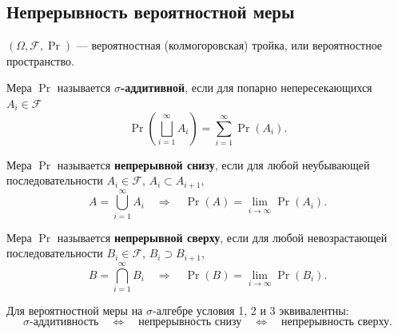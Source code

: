 \subsection{Непрерывность вероятностной меры}

\begin{definition}
    $(\Omega,\mathcal{F},\Pr)$ --- вероятностная (колмогоровская)
    тройка, или вероятностное пространство.
\end{definition}

\begin{definition}
    Мера $\Pr$ называется \textbf{$\sigma$-аддитивной}, если
    для попарно непересекающихся $A_i\in\mathcal{F}$
    \[
        \Pr\left(\bigsqcup_{i=1}^{\infty}A_i\right)
        =\sum_{i=1}^{\infty}\Pr(A_i).
    \]
\end{definition}

\begin{definition}
    Мера $\Pr$ называется \textbf{непрерывной снизу}, если
    для любой неубывающей последовательности
    $A_i\in\mathcal{F}$, $A_i\subset A_{i+1}$,
    \[
        A=\bigcup_{i=1}^{\infty}A_i
        \quad\Longrightarrow\quad
        \Pr(A)=\lim_{i\to\infty}\Pr(A_i).
    \]
\end{definition}

\begin{center}
\end{center}

\begin{definition}
    Мера $\Pr$ называется \textbf{непрерывной сверху}, если
    для любой невозрастающей последовательности
    $B_i\in\mathcal{F}$, $B_i\supset B_{i+1}$,
    \[
        B=\bigcap_{i=1}^{\infty}B_i
        \quad\Longrightarrow\quad
        \Pr(B)=\lim_{i\to\infty}\Pr(B_i).
    \]
\end{definition}

\begin{theorem}
    Для вероятностной меры на $\sigma$-алгебре условия
    1, 2 и 3 эквивалентны:
    \[
        \text{$\sigma$-аддитивность}
        \quad\Longleftrightarrow\quad
        \text{непрерывность снизу}
        \quad\Longleftrightarrow\quad
        \text{непрерывность сверху}.
    \]
\end{theorem}


